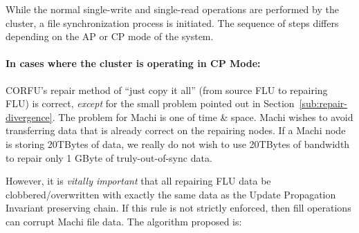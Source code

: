 \documentclass[preprint,10pt]{sigplanconf}
\begin{document}
While the normal single-write and single-read operations are performed
by the cluster, a file synchronization process is initiated.  The
sequence of steps differs depending on the AP or CP mode of the system.

\paragraph{In cases where the cluster is operating in CP Mode:}

CORFU's repair method of ``just copy it all'' (from source FLU to repairing
FLU) is correct, {\em except} for the small problem pointed out in
Section~\ref{sub:repair-divergence}.  The problem for Machi is one of
time \& space.  Machi wishes to avoid transferring data that is
already correct on the repairing nodes.  If a Machi node is storing
20TBytes of data, we really do not wish to use 20TBytes of bandwidth
to repair only 1 GByte of truly-out-of-sync data.

However, it is {\em vitally important} that all repairing FLU data be
clobbered/overwritten with exactly the same data as the Update
Propagation Invariant preserving chain.  If this rule is not strictly
enforced, then fill operations can corrupt Machi file data.  The
algorithm proposed is:
\end{document}
